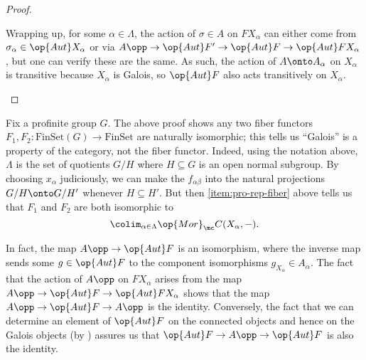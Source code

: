 \documentclass{amsart}
\begin{document}
\begin{proof}
\begin{enumerate}
        
        Wrapping up, for some $\alpha\in\Lambda$, the action of $\sigma\in A$ on $FX_\alpha$ can either come from $\sigma_\alpha\in\op{Aut}X_\alpha$ or via $A\opp\to\op{Aut}F'\to\op{Aut}F\to\op{Aut}FX_\alpha$, but one can verify these are the same.
        As such, the action of $A\onto A_\alpha$ on $X_\alpha$ is transitive because $X_\alpha$ is Galois, so $\op{Aut}F$ also acts transitively on $X_\alpha$.
        \qedhere
    \end{enumerate}
\end{proof}
\begin{remark} \label{rem:profinite-fiber-functor-unique}
    Fix a profinite group $G$. The above proof shows any two fiber functors $F_1,F_2\colon\mathrm{FinSet}(G)\to\mathrm{FinSet}$ are naturally isomorphic; this tells us ``Galois'' is a property of the category, not the fiber functor. Indeed, using the notation above, $\Lambda$ is the set of quotients $G/H$ where $H\subseteq G$ is an open normal subgroup. By choosing $x_\alpha$ judiciously, we can make the $f_{\alpha\beta}$ into the natural projections $G/H\onto G/H'$ whenever $H\subseteq H'$. But then \eqref{item:pro-rep-fiber} above tells us that $F_1$ and $F_2$ are both isomorphic to
    \[\colim_{\alpha\in\Lambda}\op{Mor}_\mc C(X_\alpha,-).\]
\end{remark}
\begin{remark} \label{rem:compute-aut-f}
    In fact, the map $A\opp\to\op{Aut}F$ is an isomorphism, where the inverse map sends some $g\in\op{Aut}F$ to the component isomorphisms $g_{X_\alpha}\in A_\alpha$. The fact that the action of $A\opp$ on $FX_\alpha$ arises from the map $A\opp\to\op{Aut}F\to\op{Aut}FX_\alpha$ shows that the map $A\opp\to\op{Aut}F\to A\opp$ is the identity. Conversely, the fact that we can determine an element of $\op{Aut}F$ on the connected objects and hence on the Galois objects (by ) assures us that $\op{Aut}F\to A\opp\to\op{Aut}F$ is also the identity.
\end{remark}
\end{document}
